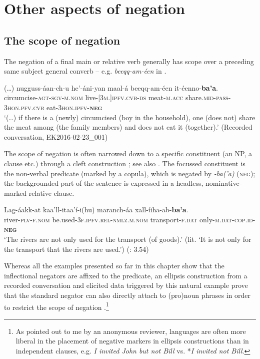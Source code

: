 \documentclass[output=paper,colorlinks,citecolor=brown,draftmode
]{langscibook}
\begin{document}
\section{Other aspects of negation}\label{sec:treis:4}
\subsection{The scope of negation}\label{sec:treis:4.1}

The negation of a final main or relative verb generally has scope over a preceding same subject general converb – e.g. \textit{beeqq-am-éen} in .

\ea\label{ex:treis:44}
\gll (…) 	nugguss-áan-ch-u				he’-áni-yan				maal-á	beeqq-am-éen						it-éenno-\textbf{ba’a}.\\
{}		circumcise-\textsc{agt-sgv-m.nom}	live-\textsc{[3m.]ipfv.cvb-ds}	meat-\textsc{m.acc} share.\textsc{mid-pass-3hon.pfv.cvb}	eat-\textsc{3hon.ipfv-\textbf{neg}}\\
\glt ‘(…) if there is a (newly) circumcised (boy in the household), one (does not) share the meat among (the family members) and does not eat it (together).’ (Recorded conversation, EK2016-02-23\_001)
\z 

The scope of negation is often narrowed down to a specific constituent (an NP, a clause etc.) through a cleft construction ; see also . The focussed constituent is the non-verbal predicate (marked by a copula), which is negated by \textit{-ba(’a)} (\textsc{neg}); the backgrounded part of the sentence is expressed in a headless, nominative-marked relative clause.

\ea\label{ex:treis:45} 
\gll Lag-áakk-at kaa’ll-itaa’í-i(hu) maranch-áa xall-íiha-ab-\textbf{ba’a}.\\
river-\textsc{plv-f.nom} be.used-\textsc{3f.ipfv.rel-nmlz.m.nom} transport-\textsc{f.dat} only-\textsc{m.dat-cop.id-\textbf{neg}}\\
\glt ‘The rivers are not only used for the transport (of goods).’ (lit. ‘It is not only for the transport that the rivers are used.’) (\cite{KEB1989}{:} 3.54)
\z 

Whereas all the examples presented so far in this chapter show that the inflectional negators are affixed to the predicate, an ellipsis construction from a recorded conversation and elicited data triggered by this natural example prove that the standard negator can also directly attach to (pro)noun phrases in order to restrict the scope of negation .\footnote{As pointed out to me by an anonymous reviewer, languages are often more liberal in the placement of negative markers in ellipsis constructions than in independent clauses, e.g. \textit{I invited John but not Bill} vs. *\textit{I invited not Bill}.} 
\end{document}
